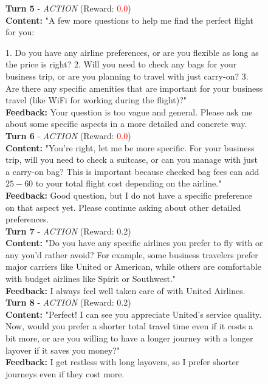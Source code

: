 \begin{figure}[t]
{\begin{tcolorbox}[colback=green!5!white, colframe=green!75!black, 
title=Good Example - Claude-4-Sonnet (Travel-444), boxrule=0.3mm, width=\textwidth, arc=3mm, auto outer arc=true]
\textbf{Turn 5} - \textit{ACTION} (Reward: \textcolor{red}{0.0})\\
\textbf{Content:} "A few more questions to help me find the perfect flight for you:

1. Do you have any airline preferences, or are you flexible as long as the price is right?  
2. Will you need to check any bags for your business trip, or are you planning to travel with just carry-on?  
3. Are there any specific amenities that are important for your business travel (like WiFi for working during the flight)?"\\
\textbf{Feedback:} Your question is too vague and general. Please ask me about some specific aspects in a more detailed and concrete way.\\

\textbf{Turn 6} - \textit{ACTION} (Reward: \textcolor{red}{0.0})\\
\textbf{Content:} "You're right, let me be more specific. For your business trip, will you need to check a suitcase, or can you manage with just a carry-on bag? This is important because checked bag fees can add $25-$60 to your total flight cost depending on the airline."\\
\textbf{Feedback:} Good question, but I do not have a specific preference on that aspect yet. Please continue asking about other detailed preferences.\\

\textbf{Turn 7} - \textit{ACTION} (Reward: \textcolor{deepgreen}{0.2})\\
\textbf{Content:} "Do you have any specific airlines you prefer to fly with or any you'd rather avoid? For example, some business travelers prefer major carriers like United or American, while others are comfortable with budget airlines like Spirit or Southwest."\\
\textbf{Feedback:} I always feel well taken care of with United Airlines.\\

\textbf{Turn 8} - \textit{ACTION} (Reward: \textcolor{deepgreen}{0.2})\\
\textbf{Content:} "Perfect! I can see you appreciate United's service quality. Now, would you prefer a shorter total travel time even if it costs a bit more, or are you willing to have a longer journey with a longer layover if it saves you money?"\\
\textbf{Feedback:} I get restless with long layovers, so I prefer shorter journeys even if they cost more.\\


\end{tcolorbox}}
\end{figure}
